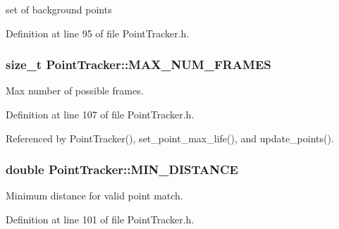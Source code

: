 set of background points 



\-Definition at line 95 of file \-Point\-Tracker.\-h.

\hypertarget{class_point_tracker_acb445ed3b433172cb10172db77ed702a}{
\subsubsection[{\-M\-A\-X\-\_\-\-N\-U\-M\-\_\-\-F\-R\-A\-M\-E\-S}]{\setlength{\rightskip}{0pt plus 5cm}size\-\_\-t {\bf \-Point\-Tracker\-::\-M\-A\-X\-\_\-\-N\-U\-M\-\_\-\-F\-R\-A\-M\-E\-S}}}
\label{class_point_tracker_acb445ed3b433172cb10172db77ed702a}


\-Max number of possible frames. 



\-Definition at line 107 of file \-Point\-Tracker.\-h.



\-Referenced by \-Point\-Tracker(), set\-\_\-point\-\_\-max\-\_\-life(), and update\-\_\-points().

\hypertarget{class_point_tracker_a3cbc1fe8d39f2c8183654a67f914fa37}{
\subsubsection[{\-M\-I\-N\-\_\-\-D\-I\-S\-T\-A\-N\-C\-E}]{\setlength{\rightskip}{0pt plus 5cm}double {\bf \-Point\-Tracker\-::\-M\-I\-N\-\_\-\-D\-I\-S\-T\-A\-N\-C\-E}}}
\label{class_point_tracker_a3cbc1fe8d39f2c8183654a67f914fa37}


\-Minimum distance for valid point match. 



\-Definition at line 101 of file \-Point\-Tracker.\-h.



